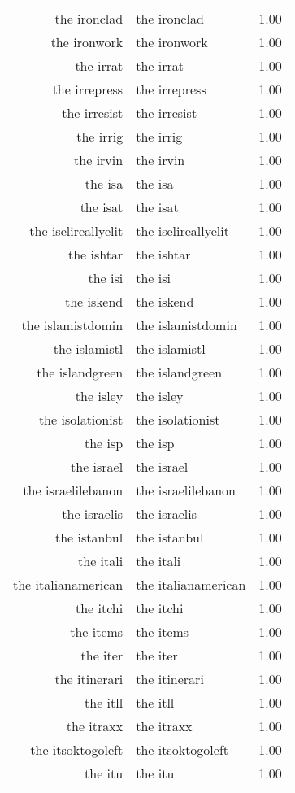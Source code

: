 \begin{table}[ht]
\begin{tabular}{rlr}
  the ironclad & the ironclad & 1.00 \\ 
  the ironwork & the ironwork & 1.00 \\ 
  the irrat & the irrat & 1.00 \\ 
  the irrepress & the irrepress & 1.00 \\ 
  the irresist & the irresist & 1.00 \\ 
  the irrig & the irrig & 1.00 \\ 
  the irvin & the irvin & 1.00 \\ 
  the isa & the isa & 1.00 \\ 
  the isat & the isat & 1.00 \\ 
  the iselireallyelit & the iselireallyelit & 1.00 \\ 
  the ishtar & the ishtar & 1.00 \\ 
  the isi & the isi & 1.00 \\ 
  the iskend & the iskend & 1.00 \\ 
  the islamistdomin & the islamistdomin & 1.00 \\ 
  the islamistl & the islamistl & 1.00 \\ 
  the islandgreen & the islandgreen & 1.00 \\ 
  the isley & the isley & 1.00 \\ 
  the isolationist & the isolationist & 1.00 \\ 
  the isp & the isp & 1.00 \\ 
  the israel & the israel & 1.00 \\ 
  the israelilebanon & the israelilebanon & 1.00 \\ 
  the israelis & the israelis & 1.00 \\ 
  the istanbul & the istanbul & 1.00 \\ 
  the itali & the itali & 1.00 \\ 
  the italianamerican & the italianamerican & 1.00 \\ 
  the itchi & the itchi & 1.00 \\ 
  the items & the items & 1.00 \\ 
  the iter & the iter & 1.00 \\ 
  the itinerari & the itinerari & 1.00 \\ 
  the itll & the itll & 1.00 \\ 
  the itraxx & the itraxx & 1.00 \\ 
  the itsoktogoleft & the itsoktogoleft & 1.00 \\ 
  the itu & the itu & 1.00 \\ 

\end{tabular}
\end{table}
